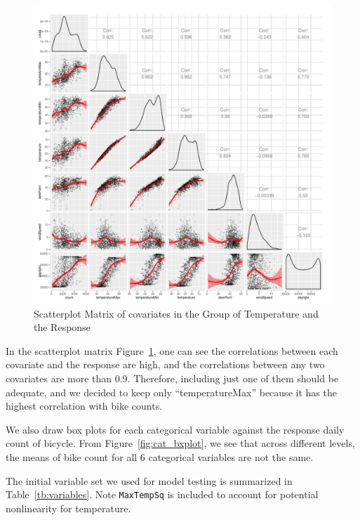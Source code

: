 \documentclass [11pt, proquest] {uwthesis}[2015/03/03]
\begin{document}
\begin{figure}
   \includegraphics[width=1\textwidth]{figures/matrix2} 
  \caption{Scatterplot Matrix of covariates in the Group of Temperature and the Response}
  \label{fig:temp_corr}
\end{figure}

In the scatterplot matrix Figure~\ref{fig:temp_corr}, one can see the correlations between each covariate and the response are high, and the correlations between any two covariates are more than 0.9. Therefore, including just one of them should be adequate, and we decided to keep only ``temperatureMax'' because it has the highest correlation with bike counts.

We also draw box plots for each categorical variable against the response daily count of bicycle. From Figure~\ref{fig:cat_bxplot}, we see that across different levels, the means of bike count for all 6 categorical variables are not the same.

The initial variable set we used for model testing is summarized in Table~\ref{tb:variables}. Note \texttt{MaxTempSq} is included to account for potential nonlinearity for temperature. 
\end{document}
